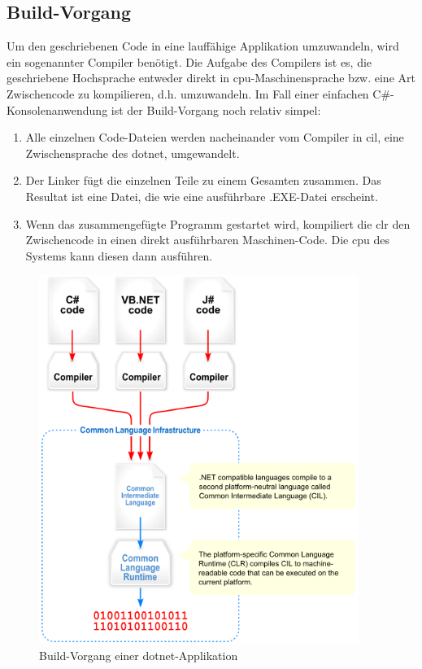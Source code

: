 \subsection{Build-Vorgang}
Um den geschriebenen Code in eine lauffähige Applikation umzuwandeln, wird ein sogenannter Compiler benötigt.
Die Aufgabe des Compilers ist es, die geschriebene Hochsprache entweder direkt in \acs{cpu}-Maschinensprache bzw. eine Art Zwischencode zu kompilieren, d.h. umzuwandeln. Im Fall einer einfachen C\#-Konsolenanwendung ist der Build-Vorgang noch relativ simpel:
\begin{enumerate}
    \item Alle einzelnen Code-Dateien werden nacheinander vom Compiler in \ac{cil}, eine Zwischensprache des \ac{dotnet}, umgewandelt.
    \item Der Linker fügt die einzelnen Teile zu einem Gesamten zusammen.
    Das Resultat ist eine Datei, die wie eine ausführbare .EXE-Datei erscheint.
    \item Wenn das zusammengefügte Programm gestartet wird, kompiliert die \ac{clr} den Zwischencode in einen direkt ausführbaren Maschinen-Code.
    Die \acs{cpu} des Systems kann diesen dann ausführen.
\end{enumerate}
\begin{figure}[H]
    \centering\includegraphics[height=12cm]{images/auswahl_rahmenwerk/dotnet-compilation.png}
    \caption{Build-Vorgang einer \ac{dotnet}-Applikation\cite{wiki-cli}}
\end{figure}

